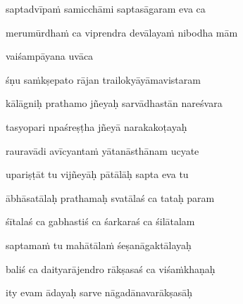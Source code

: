 saptadvīpaṁ samicchāmi saptasāgaram eva ca\thinspace{\dandab} \dontdisplaylinenum

merumūrdhaṁ ca viprendra devālayaṁ nibodha mām \veg\dontdisplaylinenum



vaiśampāyana uvāca~{\dandab}\dontdisplaylinenum 

śṇu saṁkṣepato rājan trailokyāyāmavistaram\thinspace{\danda} \dontdisplaylinenum

kālāgniḥ prathamo jñeyaḥ sarvādhastān nareśvara \veg\dontdisplaylinenum
{}

tasyopari npaśreṣṭha jñeyā narakakoṭayaḥ\thinspace{\dandab} \dontdisplaylinenum

rauravādi avīcyantaṁ yātanāsthānam ucyate \veg\dontdisplaylinenum



upariṣṭāt tu vijñeyāḥ pātālāḥ sapta eva tu\thinspace{\dandab} \dontdisplaylinenum

ābhāsatālaḥ prathamaḥ svatālaś ca tataḥ param \veg\dontdisplaylinenum
{}

śītalaś ca gabhastiś ca śarkaraś ca śilātalam\thinspace{\dandab} \dontdisplaylinenum

saptamaṁ tu mahātālaṁ śeṣanāgaktālayaḥ \veg\dontdisplaylinenum
{}

baliś ca daityarājendro rākṣasaś ca viśaṁkhaṇaḥ\thinspace{\dandab} \dontdisplaylinenum

ity evam ādayaḥ sarve nāgadānavarākṣasāḥ \veg\dontdisplaylinenum


